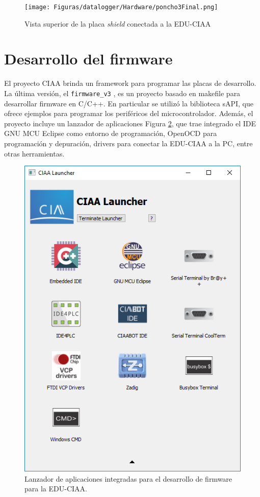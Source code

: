 




\begin{figure}[H]
    \centering
    \texttt{[image: Figuras/datalogger/Hardware/poncho3Final.png]}
    \caption{Vista superior de la placa \textit{shield} conectada a la EDU-CIAA}
    \label{fig:poncho3Final}
\end{figure}

\section{Desarrollo del firmware}\label{sec:desarrolloFirmware}

El proyecto CIAA brinda un framework para programar las placas de desarrollo. La última versión, el \texttt{firmware\_v3} \cite{ciaa2024}, es un proyecto basado en makefile para desarrollar firmware en C/C++. En particular se utilizó la biblioteca sAPI, que ofrece ejemplos para programar los periféricos del microcontrolador. Además, el proyecto incluye un lanzador de aplicaciones Figura \ref{fig:ciaaLauncher}, que trae integrado el IDE GNU MCU Eclipse como entorno de programación, OpenOCD para programación y depuración, drivers para conectar la EDU-CIAA a la PC, entre otras herramientas. 

\begin{figure}[H]
    \centering
    \includegraphics[width=0.3\linewidth]{Figuras/datalogger/Firmware/ciaaLauncher.png}
    \caption{Lanzador de aplicaciones integradas para el desarrollo de firmware para la EDU-CIAA.}
    \label{fig:ciaaLauncher}
\end{figure}

